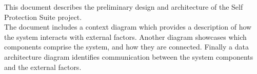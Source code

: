 This document describes the preliminary design and architecture of the Self Protection Suite project. \\
The document includes a context diagram which provides a description of how the system interacts with external factors.
Another diagram showcases which components comprise the system, and how they are connected. Finally a data architecture diagram identifies 
communication between the system components and the external factors.